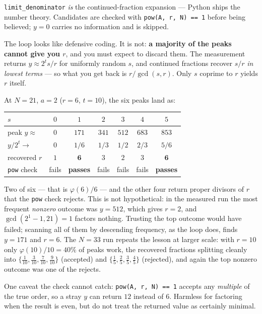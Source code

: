 \documentclass[11pt]{article}
\newcommand{\code}[1]{\texttt{#1}}
\theoremstyle{plain}
\theoremstyle{remark}
\begin{document}
\code{limit\_denominator} \emph{is} the continued-fraction expansion --- Python ships the
number theory. Candidates are checked with \code{pow(A, r, N) == 1} before being believed;
$y=0$ carries no information and is skipped.

\begin{keybox}[title={Most of the peaks are useless --- by design}]
The loop looks like defensive coding. It is not: \textbf{a majority of the peaks cannot give you
$r$}, and you must expect to discard them. The measurement returns $y\approx2^ts/r$ for uniformly
random $s$, and continued fractions recover $s/r$ \emph{in lowest terms} --- so what you get back
is $r/\gcd(s,r)$. Only $s$ coprime to $r$ yields $r$ itself.

At $N=21$, $a=2$ ($r=6$, $t=10$), the six peaks land as:
\begin{center}\small
\begin{tabular}{@{}lcccccc@{}}
\toprule
$s$ & $0$ & $1$ & $2$ & $3$ & $4$ & $5$\\
\midrule
peak $y\approx$ & $0$ & $171$ & $341$ & $512$ & $683$ & $853$\\
$y/2^t\to$ & $0$ & $1/6$ & $1/3$ & $1/2$ & $2/3$ & $5/6$\\
recovered $r$ & $1$ & $\mathbf 6$ & $3$ & $2$ & $3$ & $\mathbf 6$\\
\code{pow} check & fails & \textbf{passes} & fails & fails & fails & \textbf{passes}\\
\bottomrule
\end{tabular}
\end{center}
Two of six --- that is $\varphi(6)/6$ --- and the other four return proper divisors of $r$ that the
\code{pow} check rejects. This is not hypothetical: in the measured run the most frequent
\emph{nonzero} outcome was $y=512$, which gives $r=2$, and $\gcd(2^1{-}1,21)=1$ factors nothing.
Trusting the top outcome would have failed; scanning all of them by descending frequency, as the
loop does, finds $y=171$ and $r=6$. The $N=33$ run repeats the lesson at larger scale: with
$r=10$ only $\varphi(10)/10=40\%$ of peaks work, the recovered fractions splitting cleanly into
$\{\tfrac1{10},\tfrac3{10},\tfrac7{10},\tfrac9{10}\}$ (accepted) and
$\{\tfrac15,\tfrac25,\tfrac35,\tfrac45\}$ (rejected), and again the top nonzero outcome was one of
the rejects.

One caveat the check cannot catch: \code{pow(A, r, N) == 1} accepts any \emph{multiple} of the true
order, so a stray $y$ can return $12$ instead of $6$. Harmless for factoring when the result is
even, but do not treat the returned value as certainly minimal.
\end{keybox}
\end{document}
